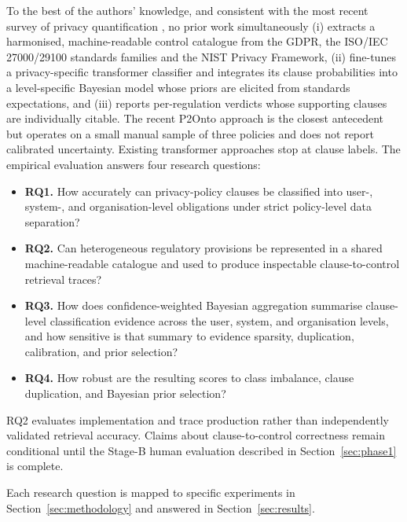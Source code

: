 \documentclass[final,3p,times,twocolumn]{elsarticle}
\begin{document}
To the best of the authors' knowledge, and consistent with the most recent survey of privacy quantification \citep{arshad2024characterisation}, no prior work simultaneously (i) extracts a harmonised, machine-readable control catalogue from the GDPR, the ISO/IEC 27000/29100 standards families and the NIST Privacy Framework, (ii) fine-tunes a privacy-specific transformer classifier and integrates its clause probabilities into a level-specific Bayesian model whose priors are elicited from standards expectations, and (iii) reports per-regulation verdicts whose supporting clauses are individually citable. The recent P2Onto approach \citep{novikova2025privacyrisks} is the closest antecedent but operates on a small manual sample of three policies and does not report calibrated uncertainty. Existing transformer approaches \citep{srinath2021privaseer,muralitharan2024privacybertlstm} stop at clause labels. The empirical evaluation answers four research questions:
	\begin{itemize}
		\item \textbf{RQ1.} How accurately can privacy-policy clauses be classified into user-, system-, and organisation-level obligations under strict policy-level data separation?

		\item \textbf{RQ2.} Can heterogeneous regulatory provisions be represented in a shared machine-readable catalogue and used to produce inspectable clause-to-control retrieval traces?
        
		\item \textbf{RQ3.} How does confidence-weighted Bayesian aggregation summarise clause-level classification evidence across the user, system, and organisation levels, and how sensitive is  that summary to evidence sparsity, duplication, calibration, and prior selection?

		\item \textbf{RQ4.} How robust are the resulting scores to class imbalance, clause duplication, and Bayesian prior selection?
	\end{itemize}

RQ2 evaluates implementation and trace production rather than independently validated retrieval accuracy. Claims about clause-to-control correctness remain conditional until the Stage-B human evaluation described in Section~\ref{sec:phase1} is complete.

Each research question is mapped to specific experiments in Section~\ref{sec:methodology} and answered in Section~\ref{sec:results}.
\end{document}
